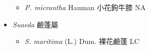 \begin{itemize}
  \begin{itemize}
        \item[] \textit{P. micrantha} Hauman  小花鉤牛膝   NA
  \end{itemize}
 \item[] \textit{Suaeda} 鹼蓬屬
                                
  \begin{itemize}
        \item[] \textit{S. maritima} (L.) Dum.  裸花鹼蓬   LC
  \end{itemize}
  \end{itemize}
